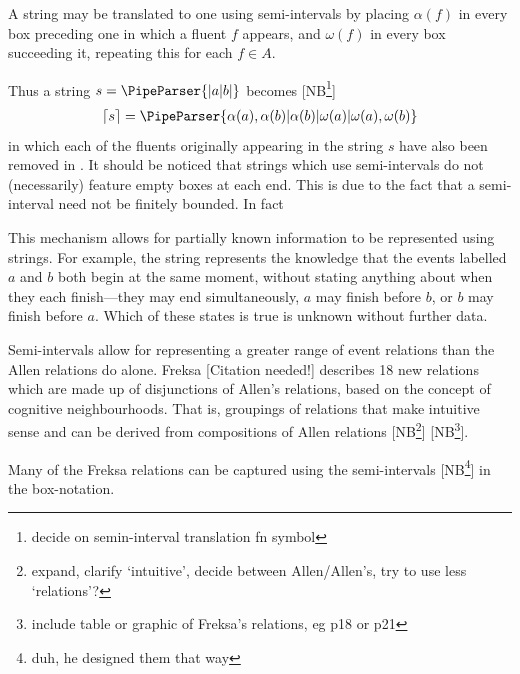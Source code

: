 \documentclass[a4paper,12pt,leqno]{article}
\newcommand{\vph}[1]{\vphantom{#1}}
\newcommand{\ebox}[1]{\fbox{$\vph{'(),}#1$}}
\newcommand{\EventString}[1]{%
	\renewcommand*{\do}[1]{\ebox{##1}}%
	\PipeParser{#1}%
}
\newcommand{\citeneeded}[1][]{{\color{red}[Citation needed!#1]}}
\newcommand{\selfnote}[1]{{\color{red}[NB\footnote{{\color{red}#1}}]}}
\newcommand{\nb}{\selfnote}
\begin{document}
A string may be translated to one using semi-intervals by placing $\alpha(f)$ in every box preceding one in which a fluent $f$ appears, and $\omega(f)$ in every box succeeding it, repeating this for each $f \in A$.\par
Thus a string $s = \EventString{{}|a|b|{}}$ becomes \nb{decide on semin-interval translation fn symbol}
\begin{align}
	\left\lceil s\right\rceil = \EventString{\alpha(a),\alpha(b)|\alpha(b)|\omega(a)|\omega(a),\omega(b)}
\end{align}
in which each of the fluents originally appearing in the string $s$ have also been removed in . It should be noticed that strings which use semi-intervals do not (necessarily) feature empty boxes at each end. This is due to the fact that a semi-interval need not be finitely bounded. In fact

This mechanism allows for partially known information to be represented using strings. For example, the string \EventString{\alpha(a), \alpha(b)|{}} represents the knowledge that the events labelled $a$ and $b$ both begin at the same moment, without stating anything about when they each finish---they may end simultaneously, $a$ may finish before $b$, or $b$ may finish before $a$. Which of these states is true is unknown without further data.

Semi-intervals allow for representing a greater range of event relations than the Allen relations do alone. Freksa \citeneeded{} describes 18 new relations which are made up of disjunctions of Allen's relations, based on the concept of cognitive neighbourhoods. That is, groupings of relations that make intuitive sense and can be derived from compositions of Allen relations \nb{expand, clarify `intuitive', decide between Allen/Allen's, try to use less `relations'?} \nb{include table or graphic of Freksa's relations, eg p18 or p21}.

Many of the Freksa relations can be captured using the semi-intervals \nb{duh, he designed them that way} in the box-notation.
\end{document}
